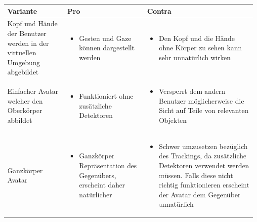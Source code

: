 \begin{center}
	\begin{tabularx} {\textwidth} { | B | B | B | }
		\hline
		\color{white} \textbf{Variante} & \color{white} \textbf{Pro} & 
		\color{white} \textbf{Contra} \\
		\hline
		\vspace{1pt}
		Kopf und Hände der Benutzer werden in der virtuellen Umgebung abgebildet & 
		\begin{itemize} [leftmargin=*,noitemsep,topsep=0pt]
			\item Gesten und Gaze können dargestellt werden
		\end{itemize} & 
		\begin{itemize} [leftmargin=*,noitemsep,topsep=0pt]
			\item Den Kopf und die Hände ohne Körper zu sehen kann sehr unnatürlich wirken
		\end{itemize} \\
		\hline
		\vspace{1pt}
		Einfacher Avatar welcher den Oberkörper abbildet & 
		\begin{itemize} [leftmargin=*,noitemsep,topsep=0pt]
			\item Funktioniert ohne zusätzliche Detektoren
		\end{itemize} & 
		\begin{itemize} [leftmargin=*,noitemsep,topsep=0pt]
			\item Versperrt dem andern Benutzer möglicherweise die Sicht auf Teile von relevanten Objekten
		\end{itemize} \\
		\hline
		\vspace{1pt}
		Ganzkörper Avatar & 
		\begin{itemize} [leftmargin=*,noitemsep,topsep=0pt]
			\item Ganzkörper Repräsentation des Gegenübers, erscheint daher natürlicher
		\end{itemize} & 
		\begin{itemize} [leftmargin=*,noitemsep,topsep=0pt]
			\item Schwer umzusetzen bezüglich des Trackings, da zusätzliche Detektoren verwendet werden müssen. Falls diese nicht richtig funktionieren erscheint der Avatar dem Gegenüber unnatürlich
		\end{itemize} \\
		\hline	
	\end{tabularx}
\end{center}
\label{tbl:varianten_avatar}

